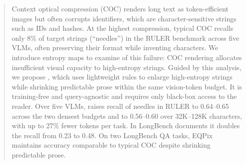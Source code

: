 \begin{abstract}
    Context optical compression (COC) renders long text as token-efficient images but often corrupts identifiers, which are character-sensitive strings such as IDs and hashes. At the highest compression, typical COC recalls only 8\% of target strings (``needles'') in the RULER benchmark across five VLMs, often preserving their format while inventing characters. We introduce entropy maps to examine of this failure: COC rendering allocates insufficient visual capacity to high-entropy strings. Guided by this analysis, we propose \name, which uses lightweight rules to enlarge high-entropy strings while shrinking predictable prose within the same vision-token budget.
    It is training-free and query-agnostic and requires only black-box access to the reader.
    Over five VLMs, \name raises recall of needles in RULER to 0.64--0.65 across the two densest budgets and to 0.56--0.60 over 32K--128K characters, with up to 27\% fewer tokens per task.
    In LongBench documents it doubles the recall from 0.23 to 0.48.
    On two LongBench QA tasks, EQPix maintains accuracy comparable to typical COC despite shrinking predictable prose.

\end{abstract}
